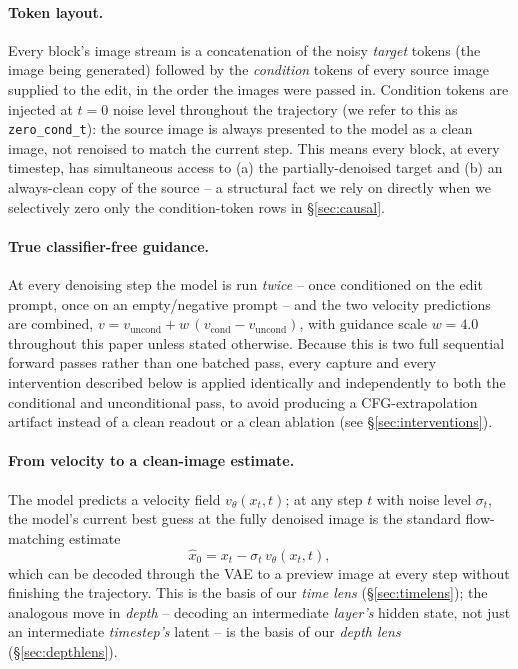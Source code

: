 \documentclass[10pt,twocolumn]{article}
\begin{document}
\paragraph{Token layout.} Every block's image stream is a concatenation
of the noisy \emph{target} tokens (the image being generated) followed
by the \emph{condition} tokens of every source image supplied to the
edit, in the order the images were passed in. Condition tokens are
injected at $t{=}0$ noise level throughout the trajectory (we refer to
this as \texttt{zero\_cond\_t}): the source image is always presented to
the model as a clean image, not renoised to match the current step. This
means every block, at every timestep, has simultaneous access to (a) the
partially-denoised target and (b) an always-clean copy of the source --
a structural fact we rely on directly when we selectively zero only the
condition-token rows in \S\ref{sec:causal}.

\paragraph{True classifier-free guidance.} At every denoising step the
model is run \emph{twice} -- once conditioned on the edit prompt, once
on an empty/negative prompt -- and the two velocity predictions are
combined, $v = v_{\text{uncond}} + w\,(v_{\text{cond}} -
v_{\text{uncond}})$, with guidance scale $w{=}4.0$ throughout this paper
unless stated otherwise. Because this is two full sequential forward
passes rather than one batched pass, every capture and every
intervention described below is applied identically and independently to
both the conditional and unconditional pass, to avoid producing a
CFG-extrapolation artifact instead of a clean readout or a clean
ablation (see \S\ref{sec:interventions}).

\paragraph{From velocity to a clean-image estimate.} The model predicts a
velocity field $v_\theta(x_t, t)$; at any step $t$ with noise level
$\sigma_t$, the model's current best guess at the fully denoised image
is the standard flow-matching estimate
\begin{equation}
  \hat{x}_0 = x_t - \sigma_t\, v_\theta(x_t, t),
\end{equation}
which can be decoded through the VAE to a preview image at every step
without finishing the trajectory. This is the basis of our \emph{time
lens} (\S\ref{sec:timelens}); the analogous move in \emph{depth} --
decoding an intermediate \emph{layer's} hidden state, not just an
intermediate \emph{timestep's} latent -- is the basis of our \emph{depth
lens} (\S\ref{sec:depthlens}).
\end{document}
